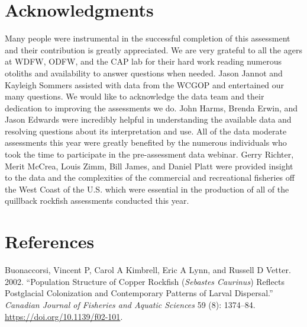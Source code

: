 \documentclass[11pt,
  english,
  a4paper,
]{article}
\begin{document}

\hypertarget{acknowledgments}{%
\section{Acknowledgments}\label{acknowledgments}}

\leavevmode\tagmcend\tagstructend


Many people were instrumental in the successful completion of this assessment and their contribution is greatly appreciated. We are very grateful to all the agers at WDFW, ODFW, and the CAP lab for their hard work reading numerous otoliths and availability to answer questions when needed. Jason Jannot and Kayleigh Sommers assisted with data from the WCGOP and entertained our many questions. We would like to acknowledge the data team and their dedication to improving the assessments we do. John Harms, Brenda Erwin, and Jason Edwards were incredibly helpful in understanding the available data and resolving questions about its interpretation and use. All of the data moderate assessments this year were greatly benefited by the numerous individuals who took the time to participate in the pre-assessment data webinar. Gerry Richter, Merit McCrea, Louis Zimm, Bill James, and Daniel Platt were provided insight to the data and the complexities of the commercial and recreational fisheries off the West Coast of the U.S. which were essential in the production of all of the quillback rockfish assessments conducted this year.

\leavevmode\tagmcend\tagstructend\par

\clearpage


\hypertarget{references}{%
\section{References}\label{references}}

\leavevmode\tagmcend\tagstructend


\hypertarget{refs}{}
\leavevmode\hypertarget{ref-buonaccorsi_population_2002}{}%
Buonaccorsi, Vincent P, Carol A Kimbrell, Eric A Lynn, and Russell D Vetter. 2002. ``Population Structure of Copper Rockfish (\emph{Sebastes Caurinus}) Reflects Postglacial Colonization and Contemporary Patterns of Larval Dispersal.'' \emph{Canadian Journal of Fisheries and Aquatic Sciences} 59 (8): 1374--84. \url{https://doi.org/10.1139/f02-101}.
\end{document}
